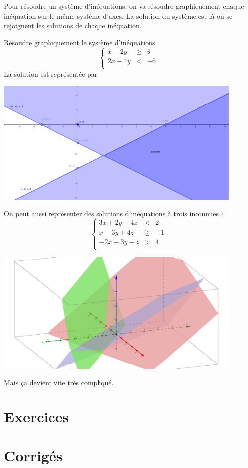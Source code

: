 Pour résoudre un système d'inéquations, on va résoudre graphiquement chaque inéquation sur le même système d'axes. La solution du système est là où se rejoignent les solutions de chaque inéquation.

\begin{exemple}
Résoudre graphiquement le système d'inéquations 
$$
\left\{
\begin{array}{lcl}
x-2y &\geq & 6\\
2x-4y & < & -6\\
\end{array}
\right.
$$
La solution est représentée par 
\begin{center}
\includegraphics[width=0.9\textwidth]{inequation1/inequation21.png}
\end{center}
\end{exemple}

\begin{remarque}
On peut aussi représenter des solutions d'inéquations à trois inconnues :
$$
\left\{
\begin{array}{lcl}
3x + 2y - 4z &<& 2\\
x - 3y + 4z &\geq & -1\\
-2x - 3y - z &>& 4 \\
\end{array}
\right.
$$
\begin{center}
\includegraphics[width = 0.9\textwidth]{inequation1/inequation3.png}
\end{center}
Mais ça devient vite très compliqué.
\end{remarque}

\section{Exercices}



\section{Corrigés}

